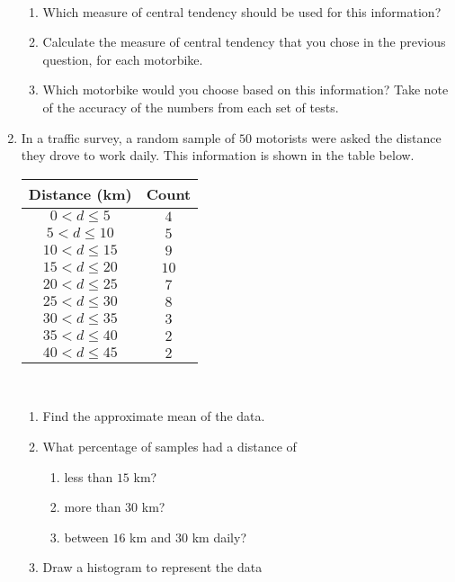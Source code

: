 \begin{eocexercises}{}
\begin{enumerate}[itemsep=6pt, label=\textbf{\arabic*}.]
\begin{center}
\begin{tabular}
      \end{tabular}
    \end{center}
\vspace {8pt}\\
\begin{enumerate}[noitemsep, label=\textbf{(\alph*)} ]
    \item Which measure of central tendency should be used for this
      information?
    \item Calculate the measure of central tendency that you chose in
      the previous question, for each motorbike.
    \item Which motorbike would you choose based on this information?
      Take note of the accuracy of the numbers from each set of tests.
    \end{enumerate}

  \item In a traffic survey, a random sample of $50$ motorists were
    asked the distance they drove to work daily. This information is
    shown in the table below.\\
    \begin{center}
      \begin{tabular}{|c|c|} \hline
     
        \textbf{Distance (km)} & \textbf{Count} \\ \hline

        $0 < d \leq 5$ & $4$ \\ \hline
        $5 < d \leq 10$ & $5$ \\\hline
        $10 < d \leq 15$ & $9$ \\\hline
        $15 < d \leq 20$ & $10$ \\\hline
        $20 < d \leq 25$ & $7$ \\\hline
        $25 < d \leq 30$ & $8$ \\\hline
        $30 < d \leq 35$ & $3$ \\\hline
        $35 < d \leq 40$ & $2$ \\\hline
        $40 < d \leq 45$ & $2$ \\\hline

      \end{tabular}
    \end{center}
\vspace {8pt}\\
     \begin{enumerate}[noitemsep, label=\textbf{(\alph*)} ]
    \item Find the approximate mean of the data.
    \item What percentage of samples had a distance of
      \begin{enumerate}[noitemsep, label=\textbf{\roman*}. ]
      \item less than $15$ km?
      \item more than $30$ km?
      \item between $16$ km and $30$ km daily?
      \end{enumerate}
\item Draw a histogram to represent the data
    \end{enumerate}


\end{enumerate}
\end{eocexercises}
